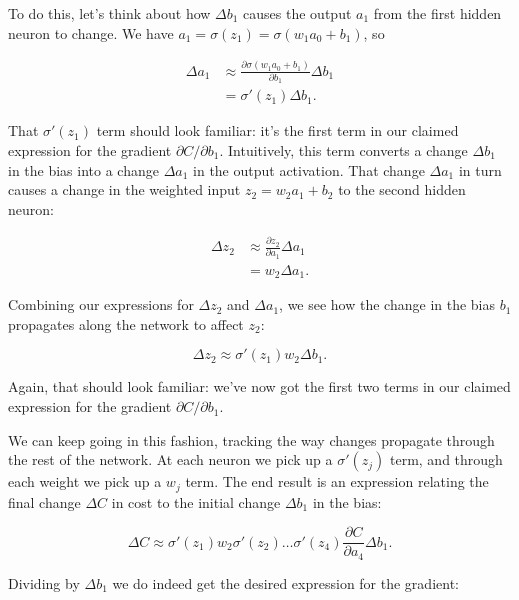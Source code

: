 To do this, let's think about how $\Delta b_1$ causes the output $a_1$ from the first hidden neuron to change. We have $a_1 = \sigma(z_1) = \sigma(w_1 a_0 + b_1)$, so

\begin{align}
\Delta a_1 &\approx \frac{\partial \sigma(w_1 a_0+b_1)}{\partial b_1} \Delta b_1 \tag{115} \\ &= \sigma'(z_1) \Delta b_1. \tag{116}
\end{align}

\noindent That $\sigma'(z_1)$ term should look familiar: it's the first term in our claimed expression for the gradient $\partial C / \partial b_1$. Intuitively, this term converts a change $\Delta b_1$ in the bias into a change $\Delta a_1$ in the output activation. That change $\Delta a_1$ in turn causes a change in the weighted input $z_2 = w_2 a_1 + b_2$ to the second hidden neuron:

\begin{align}
\Delta z_2 &\approx \frac{\partial z_2}{\partial a_1} \Delta a_1 \tag{117} \\ &= w_2 \Delta a_1. \tag{118}
\end{align}

\noindent Combining our expressions for $\Delta z_2$ and $\Delta a_1$, we see how the change in the bias $b_1$ propagates along the network to affect $z_2$:

\begin{equation}
\Delta z_2 \approx \sigma'(z_1) w_2 \Delta b_1.
\tag{119}
\end{equation}

\noindent Again, that should look familiar: we've now got the first two terms in our claimed expression for the gradient $\partial C / \partial b_1$.


We can keep going in this fashion, tracking the way changes propagate through the rest of the network. At each neuron we pick up a $\sigma'(z_j)$ term, and through each weight we pick up a $w_j$ term. The end result is an expression relating the final change $\Delta C$ in cost to the initial change $\Delta b_1$ in the bias:

\begin{equation}
\Delta C \approx \sigma'(z_1) w_2 \sigma'(z_2) \ldots \sigma'(z_4) \frac{\partial C}{\partial a_4} \Delta b_1.
\tag{120}
\end{equation}

\noindent Dividing by $\Delta b_1$ we do indeed get the desired expression for the gradient:

